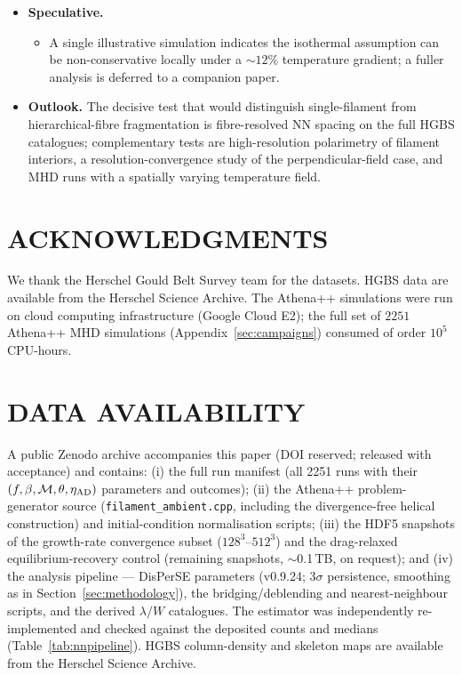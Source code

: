 \documentclass[usenatbib,twoside,twocolumn]{mnras}
\begin{document}
\begin{itemize}
    \item \textbf{Speculative.}
    \begin{itemize}
        \item A single illustrative simulation indicates the isothermal assumption can be non-conservative locally under a $\sim12\%$ temperature gradient; a fuller analysis is deferred to a companion paper.
    \end{itemize}

    \item \textbf{Outlook.} The decisive test that would distinguish single-filament from hierarchical-fibre fragmentation is fibre-resolved NN spacing on the full HGBS catalogues; complementary tests are high-resolution polarimetry of filament interiors, a resolution-convergence study of the perpendicular-field case, and MHD runs with a spatially varying temperature field.
    \end{itemize}

\section*{ACKNOWLEDGMENTS}

We thank the Herschel Gould Belt Survey team for the datasets. HGBS data are available from the Herschel Science Archive. The Athena++ simulations were run on cloud computing infrastructure (Google Cloud E2); the full set of $2251$ Athena++ MHD simulations (Appendix~\ref{sec:campaigns}) consumed of order $10^5$ CPU-hours.

\section*{DATA AVAILABILITY}

A public Zenodo archive accompanies this paper (DOI reserved; released with acceptance) and contains: (i) the full run manifest (all 2251 runs with their $(f,\beta,\mathcal{M},\theta,\eta_{\rm AD})$ parameters and outcomes); (ii) the Athena++ problem-generator source (\texttt{filament\_ambient.cpp}, including the divergence-free helical construction) and initial-condition normalisation scripts; (iii) the HDF5 snapshots of the growth-rate convergence subset ($128^3$--$512^3$) and the drag-relaxed equilibrium-recovery control (remaining snapshots, $\sim$0.1\,TB, on request); and (iv) the analysis pipeline --- DisPerSE parameters (v0.9.24; $3\sigma$ persistence, smoothing as in Section~\ref{sec:methodology}), the bridging/deblending and nearest-neighbour scripts, and the derived $\lambda/W$ catalogues. The estimator was independently re-implemented and checked against the deposited counts and medians (Table~\ref{tab:nnpipeline}). HGBS column-density and skeleton maps are available from the Herschel Science Archive.
\end{document}
